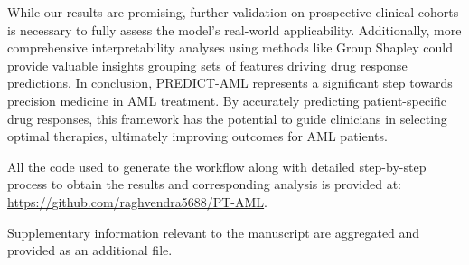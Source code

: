 \documentclass[pdflatex,sn-mathphys-num]{sn-jnl}%
\theoremstyle{thmstyleone}%
\theoremstyle{thmstyletwo}%
\theoremstyle{thmstylethree}%
\begin{document}
While our results are promising, further validation on prospective clinical cohorts is necessary to fully assess the model's real-world applicability. Additionally, more comprehensive interpretability analyses using methods like Group Shapley \cite{} could provide valuable insights grouping sets of features driving drug response predictions. In conclusion, PREDICT-AML represents a significant step towards precision medicine in AML treatment. By accurately predicting patient-specific drug responses, this framework has the potential to guide clinicians in selecting optimal therapies, ultimately improving outcomes for AML patients.

\backmatter

All the code used to generate the workflow along with detailed step-by-step process to obtain the results and corresponding analysis is provided at: \url{https://github.com/raghvendra5688/PT-AML}.

Supplementary information relevant to the manuscript are aggregated and provided as an additional file.





\end{document}
